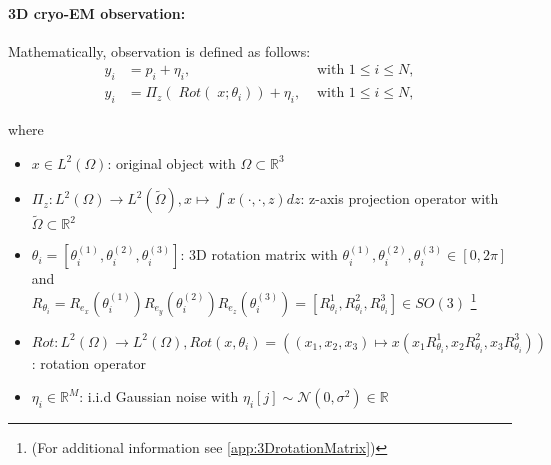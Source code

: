 \paragraph{3D cryo-EM observation:}
Mathematically, observation is defined as follows:
\begin{equation}
    \label{eq:cryoEmSimple}
    \begin{aligned}
        y_i &= p_i + \eta_i, &\text{ with } 1 \leq i \leq N,\\
        y_i &= \Pi_z  (\; Rot (\;x; \theta_i )) + \eta_i, &\text{ with } 1 \leq i \leq N,    
    \end{aligned}
\end{equation}

where 
\begin{itemize}
    \item $x \in L^2(\Omega)$: original object with $\Omega \subset \mathbb{R}^3 $
    \item $\Pi_z : L^2(\Omega) \to L^2(\tilde{\Omega}), x \mapsto  \int x(\cdot,\cdot,z) dz$: z-axis projection operator
          with $\tilde{\Omega} \subset \mathbb{R}^2$
    \item $\theta_i = [\theta_i^{(1)}, \theta_i^{(2)}, \theta_i^{(3)} ] $: 3D rotation matrix with $ \theta_i^{(1)}, \theta_i^{(2)}, \theta_i^{(3)} \in [0, 2 \pi]$ and \\
          $R_{\theta_i} =  R_{e_x} (\theta_i^{(1)}) R_{e_y} (\theta_i^{(2)}) R_{e_z} (\theta_i^{(3)}) = [R^1_{\theta_i}, R^2_{\theta_i}, R^3_{\theta_i}] \in SO(3)$ 
          \footnote{(For additional information see \ref{app:3DrotationMatrix})}
          
    \item $\textit{Rot} : L^2(\Omega) \to L^2(\Omega), \textit{Rot}(x, \theta_i) = \left((x_1,x_2,x_3) \mapsto x( x_1R^1_{\theta_i}, x_2R^2_{\theta_i}, x_3R^3_{\theta_i})\right)$: rotation operator
    \item $\eta_i \in \mathbb{R}^M$: i.i.d Gaussian noise with $\eta_i[j] \sim \mathcal{N}(0,\sigma^2) \in \mathbb{R}$
\end{itemize}



